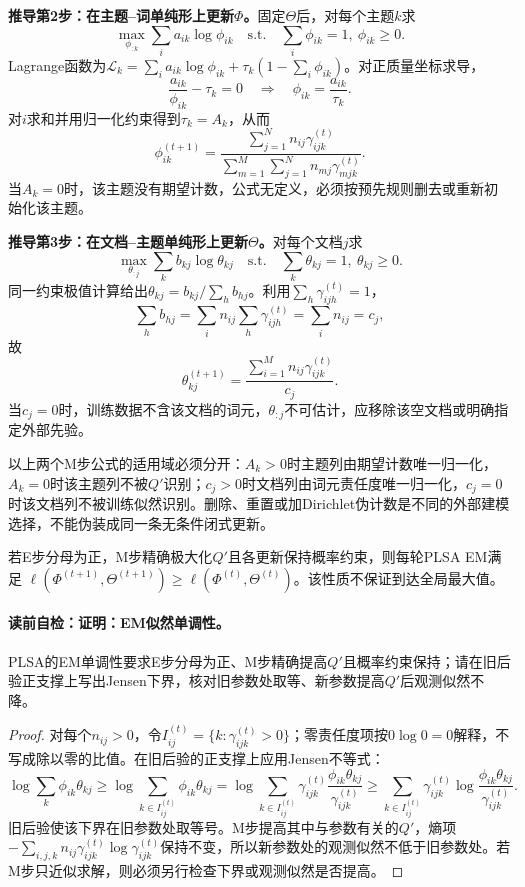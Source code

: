 \textbf{推导第2步：在主题--词单纯形上更新$\Phi$。}固定$\Theta$后，对每个主题$k$求
\[
\max_{\phi_{:k}}\sum_i a_{ik}\log\phi_{ik}
\quad\text{s.t.}\quad \sum_i\phi_{ik}=1,\ \phi_{ik}\ge0.
\]
Lagrange函数为$\mathcal L_k=\sum_i a_{ik}\log\phi_{ik}+\tau_k(1-\sum_i\phi_{ik})$。对正质量坐标求导，
\[
\frac{a_{ik}}{\phi_{ik}}-\tau_k=0
\quad\Longrightarrow\quad
\phi_{ik}=\frac{a_{ik}}{\tau_k}.
\]
对$i$求和并用归一化约束得到$\tau_k=A_k$，从而
\[
\boxed{\displaystyle
\phi_{ik}^{(t+1)}=
\frac{\sum_{j=1}^N n_{ij}\gamma_{ijk}^{(t)}}
{\sum_{m=1}^M\sum_{j=1}^N n_{mj}\gamma_{mjk}^{(t)}}}.
\]
当$A_k=0$时，该主题没有期望计数，公式无定义，必须按预先规则删去或重新初始化该主题。

\textbf{推导第3步：在文档--主题单纯形上更新$\Theta$。}对每个文档$j$求
\[
\max_{\theta_{:j}}\sum_k b_{kj}\log\theta_{kj}
\quad\text{s.t.}\quad \sum_k\theta_{kj}=1,\ \theta_{kj}\ge0.
\]
同一约束极值计算给出$\theta_{kj}=b_{kj}/\sum_hb_{hj}$。利用$\sum_h\gamma_{ijh}^{(t)}=1$，
\[
\sum_hb_{hj}=\sum_i n_{ij}\sum_h\gamma_{ijh}^{(t)}
=\sum_i n_{ij}=c_j,
\]
故
\[
\boxed{\displaystyle
\theta_{kj}^{(t+1)}=
\frac{\sum_{i=1}^M n_{ij}\gamma_{ijk}^{(t)}}{c_j}}.
\]
当$c_j=0$时，训练数据不含该文档的词元，$\theta_{:j}$不可估计，应移除该空文档或明确指定外部先验。

以上两个M步公式的适用域必须分开：$A_k>0$时主题列由期望计数唯一归一化，$A_k=0$时该主题列不被$Q'$识别；$c_j>0$时文档列由词元责任度唯一归一化，$c_j=0$时该文档列不被训练似然识别。删除、重置或加Dirichlet伪计数是不同的外部建模选择，不能伪装成同一条无条件闭式更新。

\label{struct:V4-C06-CH12}
\begin{proposition}[EM似然单调性]\label{prop:V4-C06-em-monotone}
若E步分母为正，M步精确极大化$Q'$且各更新保持概率约束，则每轮PLSA EM满足
$\ell(\Phi^{(t+1)},\Theta^{(t+1)})\ge
\ell(\Phi^{(t)},\Theta^{(t)})$。该性质不保证到达全局最大值。
\end{proposition}
\label{struct:V4-C06-CH13}
\paragraph{读前自检：证明：EM似然单调性。}PLSA的EM单调性要求E步分母为正、M步精确提高$Q'$且概率约束保持；请在旧后验正支撑上写出Jensen下界，核对旧参数处取等、新参数提高$Q'$后观测似然不降。\par

\begin{proof}
对每个$n_{ij}>0$，令$I_{ij}^{(t)}=\{k:\gamma_{ijk}^{(t)}>0\}$；零责任度项按$0\log0=0$解释，不写成除以零的比值。在旧后验的正支撑上应用Jensen不等式：
\[
\log\sum_k\phi_{ik}\theta_{kj}
\ge\log\sum_{k\in I_{ij}^{(t)}}\phi_{ik}\theta_{kj}
=\log\sum_{k\in I_{ij}^{(t)}}\gamma_{ijk}^{(t)}
\frac{\phi_{ik}\theta_{kj}}{\gamma_{ijk}^{(t)}}
\ge\sum_{k\in I_{ij}^{(t)}}\gamma_{ijk}^{(t)}
\log\frac{\phi_{ik}\theta_{kj}}{\gamma_{ijk}^{(t)}}.
\]
旧后验使该下界在旧参数处取等号。M步提高其中与参数有关的$Q'$，熵项
$-\sum_{i,j,k}n_{ij}\gamma_{ijk}^{(t)}\log\gamma_{ijk}^{(t)}$保持不变，所以新参数处的观测似然不低于旧参数处。若M步只近似求解，则必须另行检查下界或观测似然是否提高。
\end{proof}

